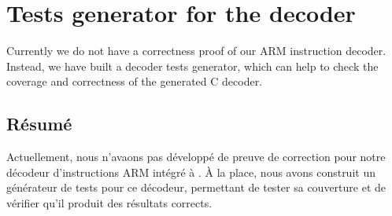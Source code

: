 
\chapter{Tests generator for the decoder}%
\label{cpt:other}

Currently we do not have a correctness proof of our ARM instruction decoder.
Instead, we have built a decoder tests generator,
which can help to check the coverage and
correctness of the generated C decoder.


\section*{Résumé}

\begin{resume}
Actuellement, nous n'avaons pas développé de preuve de correction
pour notre décodeur d'instructions ARM intégré à \simlight.
À la place, nous avons construit un générateur de tests pour ce décodeur,
permettant de tester sa couverture et de vérifier qu'il produit
des résultats corrects.
\end{resume}

\bigskip


